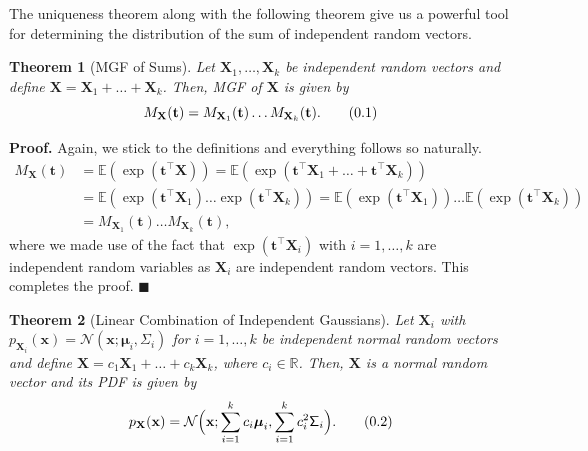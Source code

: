 \documentclass[10pt]{article}
\newtheorem{thm}{Theorem}[section]
\theoremstyle{definition}
\newenvironment{prf}{\noindent\textbf{Proof.}}{\hfill$\blacksquare$}
\newcommand\eqnum{\addtocounter{equation}{1}\tag{\arabic{section}.\arabic{equation}}}
\begin{document}
The uniqueness theorem along with the following theorem give us a powerful tool for determining the distribution of the sum of independent random vectors.
\begin{thm}[MGF of Sums]\label{thm:MGF:sum}
Let $\mathbf{X}_1,\dots,\mathbf{X}_k$ be independent random vectors and define $\mathbf{X}=\mathbf{X}_1+\dots+\mathbf{X}_k$. Then, MGF of $\mathbf{X}$ is given by
\begin{equation*}
M_{\mathbf{X}}(\mathbf{t}) = M_{\mathbf{X}_1}(\mathbf{t}) \dots M_{\mathbf{X}_k}(\mathbf{t}).
\eqnum
\label{eq:MGF:sum}
\end{equation*}
\end{thm}
\begin{prf}
Again, we stick to the definitions and everything follows so naturally.
\begin{align*}
M_{\mathbf{X}}(\mathbf{t}) &= \mathbb{E}(\exp(\mathbf{t}^{\top}\mathbf{X}))
= \mathbb{E}(\exp(\mathbf{t}^{\top}\mathbf{X}_1+\dots+\mathbf{t}^{\top}\mathbf{X}_k)) \\
&= \mathbb{E}(\exp(\mathbf{t}^{\top}\mathbf{X}_1)\dots\exp(\mathbf{t}^{\top}\mathbf{X}_k))
= \mathbb{E}(\exp(\mathbf{t}^{\top}\mathbf{X}_1))\dots\mathbb{E}(\exp(\mathbf{t}^{\top}\mathbf{X}_k)) \\
&= M_{\mathbf{X}_1}(\mathbf{t}) \dots M_{\mathbf{X}_k}(\mathbf{t}),
\end{align*}
where we made use of the fact that $\exp(\mathbf{t}^{\top}\mathbf{X}_i)$ with $i=1,\dots,k$ are independent random variables as $\mathbf{X}_i$ are independent random vectors. This completes the proof.
\end{prf}
\begin{thm}[Linear Combination of Independent Gaussians]\label{thm:MVN:LC}
Let $\mathbf{X}_i$ with $p_{\mathbf{X}_i}(\mathbf{x})=\mathcal{N}(\mathbf{x}; \boldsymbol{\mu}_i, \mathsf{\Sigma}_i)$  for $i=1,\dots,k$ be independent normal random vectors and define $\mathbf{X}=c_1\mathbf{X}_1+\dots+c_k\mathbf{X}_k$, where $c_i\in\mathbb{R}$. Then, $\mathbf{X}$ is a normal random vector and its PDF is given by
\begin{equation*}
p_{\mathbf{X}}(\mathbf{x}) = \mathcal{N}\Big(\mathbf{x}; \sum_{i=1}^{k}c_i\boldsymbol{\mu}_i, \sum_{i=1}^{k}c_i^2\mathsf{\Sigma}_i\Big).
\eqnum
\label{eq:MVN:LC}
\end{equation*}
\end{thm}
\end{document}
